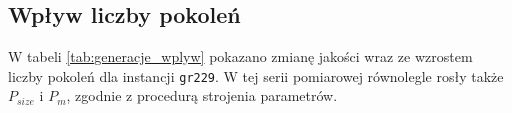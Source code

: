 \documentclass[conference]{IEEEtran}
\begin{document}
        \subsection{Wpływ liczby pokoleń}
            W tabeli \ref{tab:generacje_wplyw} pokazano zmianę jakości wraz ze wzrostem liczby pokoleń dla instancji \texttt{gr229}. W tej serii pomiarowej równolegle rosły także $P_{size}$ i $P_m$, zgodnie z procedurą strojenia parametrów.
            \begin{table}[H]
                \centering
                \caption{Wpływ liczby pokoleń na błąd i czas (gr229, mutacja Invert)}
                \label{tab:generacje_wplyw}
            \end{table}
\end{document}
